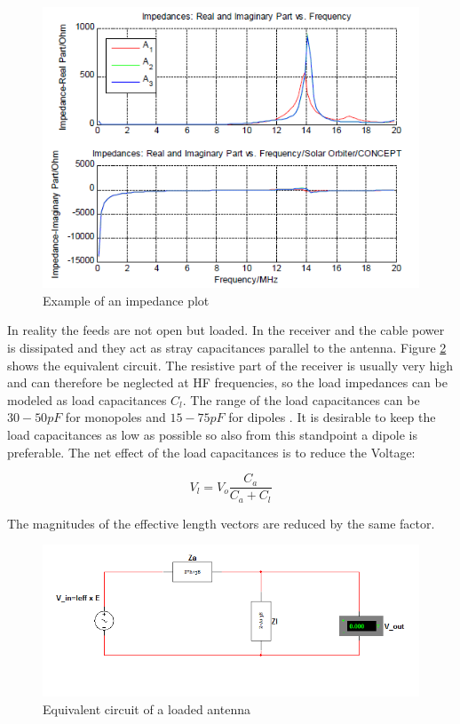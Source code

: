 \documentclass[a4paper,11pt]{report}
\begin{document}
\begin{figure}
  \noindent\includegraphics[width=12cm]{impedances_ex}
\caption{Example of an impedance plot}
\label{fig:impedance_plot}
\end{figure}

In reality the feeds are not open but loaded. In the receiver and the cable power is dissipated and they act as stray capacitances parallel to the antenna. Figure \ref{fig:equivalent_loaded} shows the equivalent circuit. The resistive part of the receiver is usually very high and can therefore be neglected at HF frequencies, so the load impedances can be modeled as load capacitances $C_l$. The range of the load capacitances can be $30-50pF$ for monopoles and $15-75pF$ for dipoles \cite{manning00}. It is desirable to keep the load capacitances as low as possible so also from this standpoint a dipole is preferable. The net effect of the load capacitances is to reduce the Voltage:

\begin{equation}
 V_l=V_o\frac{C_a}{C_a+C_l}
\end{equation}

The magnitudes of the effective length vectors are reduced by the same factor.

\begin{figure}
  \noindent\includegraphics[width=12cm]{Ersatzschaltung_loadedfeed}
\caption{Equivalent circuit of a loaded antenna}
\label{fig:equivalent_loaded}
\end{figure}
\end{document}
